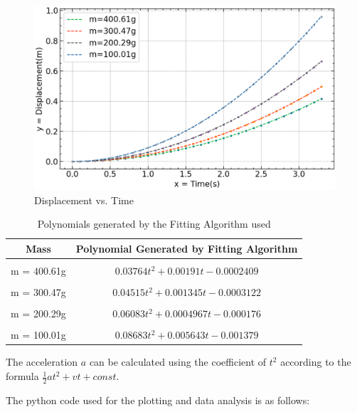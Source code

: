 \documentclass{article}
\begin{document}
 	\begin{figure}[H]
 		\centering
 		\includegraphics[scale=0.7]{displacement vs. time (fitter).png}
 		\caption{Displacement vs. Time}
 		\label{figure:displ}%
 	\end{figure}
 	
 	\begin{table}[H]
 		\centering
 		\begin{tabular}{|c||c|}
 			\hline
 			Mass      & Polynomial Generated by Fitting Algorithm \\\hline\\
 			m = 400.61g &  $0.03764 t^2 + 0.00191 t - 0.0002409$ \\
 			\hline\\
 			m = 300.47g &  $0.04515 t^2 + 0.001345 t - 0.0003122$ \\
 			\hline\\
 			m = 200.29g &  $0.06083 t^2 + 0.0004967 t - 0.000176$ \\
 			\hline\\
 			m = 100.01g & $0.08683 t^2 + 0.005643 t - 0.001379$ \\
 			\hline                     
 		\end{tabular}
 		\caption{Polynomials generated by the Fitting Algorithm used}
 		\label{table:poly}
 	\end{table}
 
 	The acceleration $a$ can be calculated using the coefficient of $t^2$ according to the formula $\frac{1}{2}at^2 + vt + const.$
 	
 	The python code used for the plotting and data analysis is as follows:
 	
\end{document}
